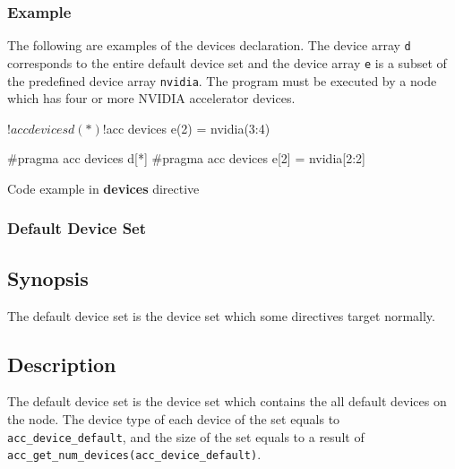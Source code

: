 \subsubsection*{Example}
The following are examples of the devices declaration. The device array {\tt d} corresponds to the entire default device set and the device array {\tt e} is a subset of the predefined device array {\tt nvidia}. The program must be executed by a node which has four or more NVIDIA accelerator devices.
%
\begin{myfigure}
\begin{minipage}{0.45\hsize}
\begin{center}
\begin{XACCFexampleL}
!$acc devices d(*)
!$acc devices e(2) = nvidia(3:4)  
\end{XACCFexampleL}
\end{center}
\end{minipage}
%
\begin{minipage}{0.53\hsize}
\begin{center}
\begin{XACCCexampleR}
#pragma acc devices d[*]
#pragma acc devices e[2] = nvidia[2:2]
\end{XACCCexampleR}
\end{center}
\end{minipage}
\caption{Code example in {\XACC} {\bf devices} directive}\label{code:devices}
\end{myfigure}


\subsubsection{Default Device Set}
\subsection*{Synopsis}
The default device set is the device set which some directives target normally.

\subsection*{Description}
The default device set is the device set which contains the all {\OACC} default devices on the node.
The device type of each device of the set equals to {\tt acc\_device\_default}, and the size of the set equals to a result of {\tt acc\_get\_num\_devices(acc\_device\_default)}.



